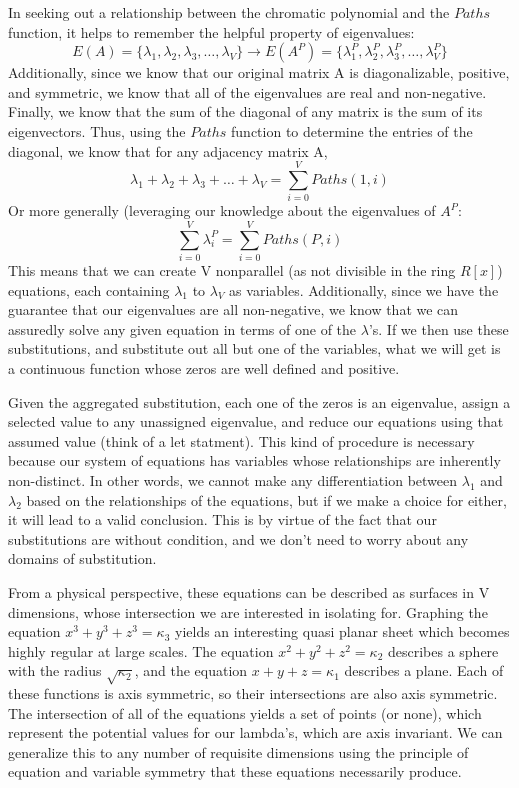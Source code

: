\documentclass[11pt,a4paper]{report}
\begin{document}
In seeking out a relationship between the chromatic polynomial and the $Paths$ function, it helps to remember the helpful property of  eigenvalues:
$$E(A) = \{\lambda_1,\lambda_2,\lambda_3, \dots, \lambda_V\} \rightarrow E(A^P) = \{\lambda_1^P,\lambda_2^P,\lambda_3^P, \dots, \lambda_V^P\} $$
Additionally, since we know that our original matrix A is diagonalizable, positive, and symmetric, we know that all of the eigenvalues are real and non-negative. 
Finally, we know that the sum of the diagonal of any matrix is the sum of its eigenvectors. 
Thus, using the $Paths$ function to determine the entries of the diagonal, we know that for any adjacency matrix A,
$$\lambda_1 + \lambda_2 + \lambda_3 + \dots + \lambda_V = \sum_{i = 0}^{V}{Paths(1, i)}$$
Or more generally (leveraging our knowledge about the eigenvalues of $A^P$:
$$ \sum_{i = 0}^V{\lambda_i^P} =  \sum_{i = 0}^{V}{Paths(P, i)}$$
This means that we can create V nonparallel (as not divisible in the ring $R[x]$) equations, each containing $\lambda_1$ to $\lambda_V$ as variables.
Additionally, since we have the guarantee that our eigenvalues are all non-negative, we know that we can assuredly solve any given equation in terms of one of the $\lambda$'s.
If we then use these substitutions, and substitute out all but one of the variables, what we will get is a continuous function whose zeros are well defined and positive. 

Given the aggregated substitution, each one of the zeros is an eigenvalue, assign a selected value to any unassigned eigenvalue, and reduce our equations using that assumed value (think of a let statment).
This kind of procedure is necessary because our system of equations has variables whose relationships are inherently non-distinct.
In other words, we cannot make any differentiation between $\lambda_1$ and $\lambda_2$ based on the relationships of the equations, but if we make a choice for either, it will lead to a valid conclusion.
This is by virtue of the fact that our substitutions are without condition, and we don't need to worry about any domains of substitution.

From a physical perspective, these equations can be described as surfaces in V dimensions, whose intersection we are interested in isolating for. 
Graphing the equation $x^3 + y^3 + z^3 = \kappa_3$ yields an interesting quasi planar sheet which becomes highly regular at large scales.  
The equation $x^2 + y^2 + z^2 = \kappa_2$ describes a sphere with the radius $\sqrt{\kappa_2}$, and the equation $x + y + z = \kappa_1$ describes a plane. 
Each of these functions is axis symmetric, so their intersections are also axis symmetric.  
The intersection of all of the equations yields a set of points (or none), which represent the potential values for our lambda's, which are axis invariant. 
We can generalize this to any number of requisite dimensions using the principle of equation and variable symmetry that these equations necessarily produce.
\end{document}
